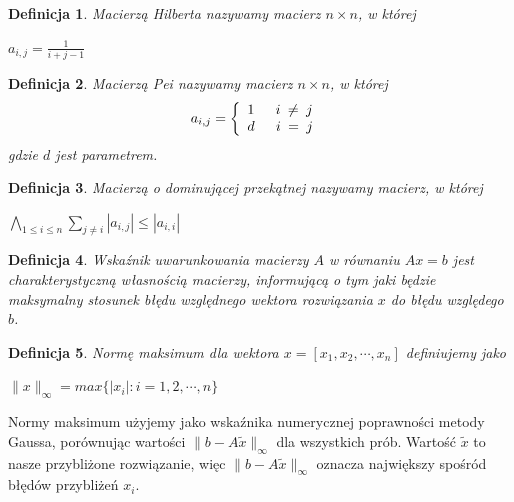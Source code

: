 \documentclass[a4paper,10pt]{article}
\newtheorem{definition}{Definicja}
\begin{document}
\begin{definition}
	Macierzą Hilberta nazywamy macierz $n \times n$, w której\\
    \begin{center}
    $a_{i,j} = \frac{1}{i+j-1}$
    \end{center}
\end{definition} 

\begin{definition}
	Macierzą Pei nazywamy macierz $n \times n$, w której\\
  \[
  a_{i,j} = \left\{
  \begin{array}{l l}
    1 \quad \texttt{ $i$ $\neq$ $j$ }\\
    d \quad \texttt{ $i$ $=$ $j$ }\\
  \end{array} \right.
  \]
    gdzie $d$ jest parametrem.
\end{definition}

\begin{definition}
    Macierzą o dominującej przekątnej nazywamy macierz, w której\\
    \begin{center}
    $\displaystyle \bigwedge_{1 \leq i \leq n } \sum_{ j \neq i } |a_{i,j}| \leq |a_{i,i}| $
    \end{center}
\end{definition}

\begin{definition}
    Wskaźnik uwarunkowania macierzy $A$ w równaniu $Ax = b$ jest charakterystyczną własnością macierzy, informującą o tym jaki będzie maksymalny stosunek błędu względnego wektora rozwiązania $x$ do błędu względego $b$.
\end{definition}

\begin{definition}
    Normę maksimum dla wektora $x = \left[ x_{1}, x_{2}, \cdots , x_{n} \right] $ definiujemy jako\\
    \begin{center}
        $ \|x\|_{\infty} = max \{|x_{i}| : i = 1, 2, \cdots , n \}$
    \end{center}
\end{definition}

Normy maksimum użyjemy jako wskaźnika numerycznej poprawności metody Gaussa,
porównując wartości $ \| b - A \tilde{x} \|_{\infty}$ dla wszystkich prób.
Wartość $\tilde x$ to nasze przybliżone rozwiązanie, więc $\| b - A \tilde{x} \|_{\infty}$ oznacza największy spośród błędów przybliżeń $x_i$.
\end{document}
